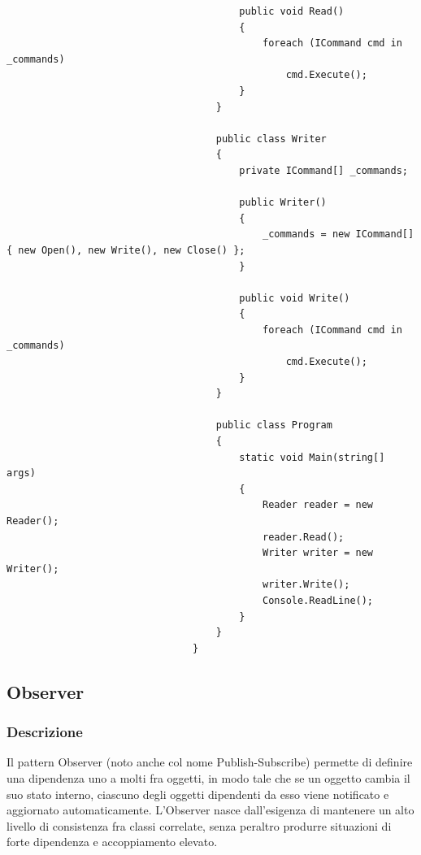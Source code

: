 \documentclass[a4paper,10pt]{article}
\begin{document}
\begin{lstlisting}
                                        public void Read()
                                        {
                                            foreach (ICommand cmd in _commands)
                                                cmd.Execute();
                                        }
                                    }
                                
                                    public class Writer
                                    {
                                        private ICommand[] _commands;
                                
                                        public Writer()
                                        {
                                            _commands = new ICommand[] { new Open(), new Write(), new Close() };
                                        }
                                
                                        public void Write()
                                        {
                                            foreach (ICommand cmd in _commands)
                                                cmd.Execute();
                                        }
                                    }
                                
                                    public class Program
                                    {
                                        static void Main(string[] args)
                                        {
                                            Reader reader = new Reader();
                                            reader.Read();
                                            Writer writer = new Writer();
                                            writer.Write();
                                            Console.ReadLine();
                                        }
                                    }
                                }
                            \end{lstlisting}
                            \newpage
                            \subsection{Observer}
                            \subsubsection{Descrizione}
                            Il pattern Observer (noto anche col nome Publish-Subscribe) permette di definire una dipendenza uno a molti fra oggetti, in modo tale che se un oggetto cambia il suo stato interno, ciascuno degli oggetti dipendenti da esso viene notificato e aggiornato automaticamente. L’Observer nasce dall’esigenza di mantenere un alto livello di consistenza fra classi correlate, senza peraltro produrre situazioni di forte dipendenza e accoppiamento elevato.
\end{document}

